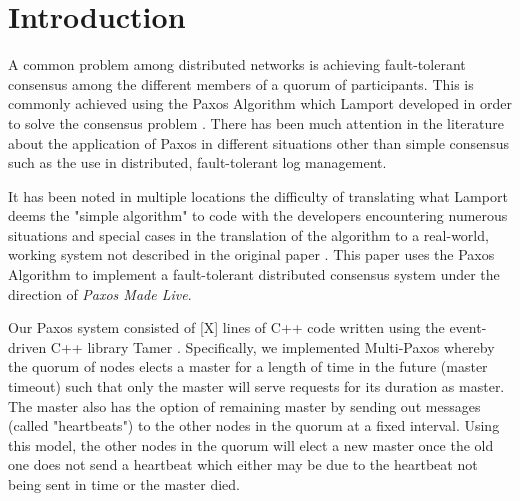 
\section{Introduction}
A common problem among distributed networks is achieving fault-tolerant consensus among the different members of a quorum of participants.  This is commonly achieved using the Paxos Algorithm which Lamport developed in order to solve the consensus problem \cite{Lamport01}.  There has been much attention in the literature about the application of Paxos in different situations other than simple consensus such as the use in distributed, fault-tolerant log management.  

It has been noted in multiple locations the difficulty of translating what Lamport deems the "simple algorithm" to code with the developers encountering numerous situations and special cases in the translation of the algorithm to a real-world, working system not described in the original paper \cite{Chandra07}.  This paper uses the Paxos Algorithm to implement a fault-tolerant distributed consensus system under the direction of \textit{Paxos Made Live}. 

Our Paxos system consisted of [X] lines of C++ code written using the event-driven C++ library Tamer \cite{Krohn07}.  Specifically, we implemented Multi-Paxos whereby the quorum of nodes elects a master for a length of time in the future (master timeout) such that only the master will serve requests for its duration as master.  The master also has the option of remaining master by sending out messages (called "heartbeats") to the other nodes in the quorum at a fixed interval.  Using this model, the other nodes in the quorum will elect a new master once the old one does not send a heartbeat which either may be due to the heartbeat not being sent in time or the master died.
